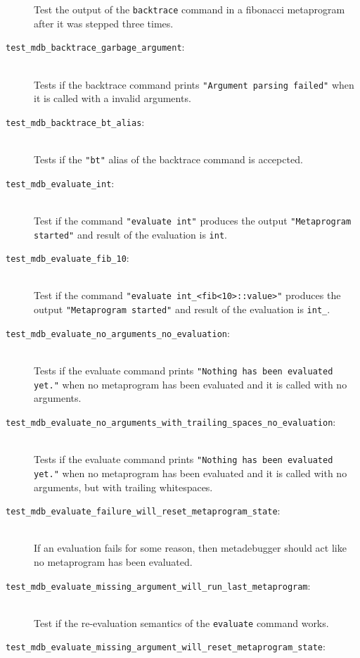 \begin{description}
        Test the output of the \texttt{backtrace} command in a fibonacci
        metaprogram after it was stepped three times.
    \item[\texttt{test\_mdb\_backtrace\_garbage\_argument}:] \hfill \\
        Tests if the backtrace command prints
        \texttt{"Argument parsing failed"} when it is called with a invalid
        arguments.
    \item[\texttt{test\_mdb\_backtrace\_bt\_alias}:] \hfill \\
        Tests if the \texttt{"bt"} alias of the backtrace command is
        accepcted.
    \item[\texttt{test\_mdb\_evaluate\_int}:] \hfill \\
        Test if the command \texttt{"evaluate int"} produces the output
        \texttt{"Metaprogram started"} and result of the evaluation is
        \texttt{int}.
    \item[\texttt{test\_mdb\_evaluate\_fib\_10}:] \hfill \\
        Test if the command \texttt{"evaluate int\_<fib<10>::value>"} produces
        the output \texttt{"Metaprogram started"} and result of the evaluation
        is \texttt{int\_<55>}.
    \item[\texttt{test\_mdb\_evaluate\_no\_arguments\_no\_evaluation}:] \hfill \\
        Tests if the evaluate command prints
        \texttt{"Nothing has been evaluated yet."} when no metaprogram has been
        evaluated and it is called with no arguments.
    \item[\texttt{test\_mdb\_evaluate\_no\_arguments\_with\_trailing\_spaces\_no\_evaluation}:] \hfill \\
        Tests if the evaluate command prints
        \texttt{"Nothing has been evaluated yet."} when no metaprogram has been
        evaluated and it is called with no arguments, but with trailing
        whitespaces.
    \item[\texttt{test\_mdb\_evaluate\_failure\_will\_reset\_metaprogram\_state}:] \hfill \\
        If an evaluation fails for some reason, then metadebugger should act
        like no metaprogram has been evaluated.
    \item[\texttt{test\_mdb\_evaluate\_missing\_argument\_will\_run\_last\_metaprogram}:] \hfill \\
        Test if the re-evaluation semantics of the \texttt{evaluate} command
        works.
    \item[\texttt{test\_mdb\_evaluate\_missing\_argument\_will\_reset\_metaprogram\_state}:] \hfill \\

\end{description}
